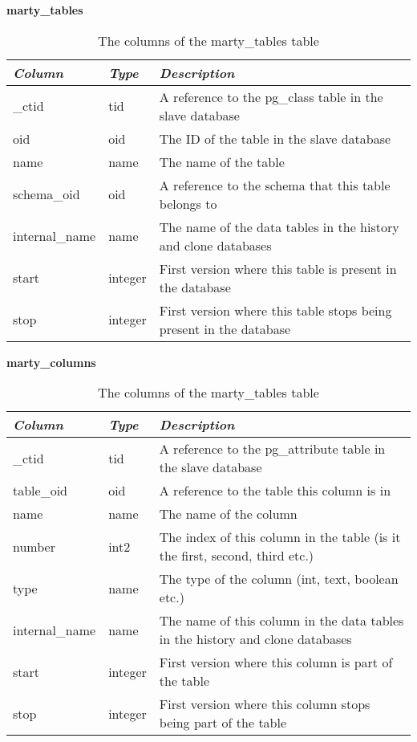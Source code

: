 \begin{table}[h]
  \centering
  \textbf{marty\_tables}
  \begin{tabularx}{\textwidth}{llX}
    \textit{Column} & \textit{Type} & \textit{Description} \\
    \midrule
    \_ctid & tid & A reference to the pg\_class table in the slave database \\
    oid & oid & The ID of the table in the slave database \\
    name & name & The name of the table \\
    schema\_oid & oid & A reference to the schema that this table belongs to \\
    internal\_name & name & The name of the data tables in the history and clone databases \\
    start & integer & First version where this table is present in the database \\
    stop & integer & First version where this table stops being present in the database \\
  \end{tabularx}
  \caption{The columns of the marty\_tables table}
  \label{tbl:marty-tables}
\end{table}

\begin{table}[h]
  \centering
  \textbf{marty\_columns}
  \begin{tabularx}{\textwidth}{llX}
    \textit{Column} & \textit{Type} & \textit{Description} \\
    \midrule
    \_ctid & tid & A reference to the pg\_attribute table in the slave database \\
    table\_oid & oid & A reference to the table this column is in \\
    name & name & The name of the column \\
    number & int2 & The index of this column in the table (is it the first, second, third etc.) \\
    type & name & The type of the column (int, text, boolean etc.) \\
    internal\_name & name & The name of this column in the data tables in the history and clone databases \\
    start & integer & First version where this column is part of the table \\
    stop & integer & First version where this column stops being part of the table \\
  \end{tabularx}
  \caption{The columns of the marty\_tables table}
  \label{tbl:marty-columns}
\end{table}

